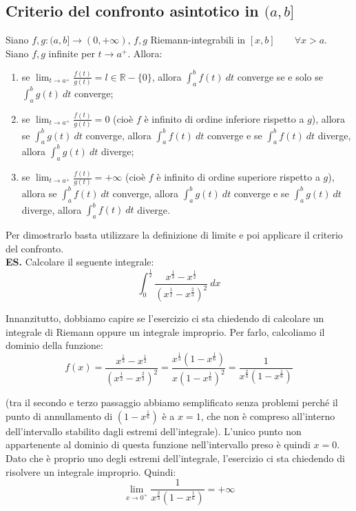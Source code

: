 \documentclass{article}
\begin{document}
\subsection{Criterio del confronto asintotico in $(a, b]$}
Siano $f, g: (a, b] \xrightarrow{} (0, +\infty)$, $f, g$ Riemann-integrabili in $[x, b] \qquad \forall x > a$. Siano $f, g$ infinite per $t \to a^+$. Allora:
\begin{enumerate}
    \item se $\lim_{t \to a^+} \frac{f(t)}{g(t)} = l \in \mathbb{R} - \{0\}$, allora $\int_a^b f(t) \ dt$ converge se e solo se $\int_a^b g(t) \ dt$ converge;
    \item se $\lim_{t \to a^+} \frac{f(t)}{g(t)} = 0$ (cioè $f$ è infinito di ordine inferiore rispetto a $g$), allora se $\int_a^b g(t) \ dt$ converge, allora $\int_a^b f(t) \ dt$ converge e se $\int_a^b f(t) \ dt$ diverge, allora $\int_a^b g(t) \ dt$ diverge;
    \item se $\lim_{t \to a^+} \frac{f(t)}{g(t)} = +\infty$ (cioè $f$ è infinito di ordine superiore rispetto a $g$), allora se $\int_a^b f(t) \ dt$ converge, allora $\int_a^b g(t) \ dt$ converge e se $\int_a^b g(t) \ dt$ diverge, allora $\int_a^b f(t) \ dt$ diverge.
\end{enumerate}

\noindent Per dimostrarlo basta utilizzare la definizione di limite e poi applicare il criterio del confronto.\\

\noindent\textbf{ES.} Calcolare il seguente integrale:
\begin{equation*}
    \int_0^{\frac{1}{2}} \frac{x^{\frac{1}{3}} - x^{\frac{1}{2}}}{(x^{\frac{1}{2}} - x^{\frac{2}{3}})^2} \ dx
\end{equation*}

\noindent Innanzitutto, dobbiamo capire se l'esercizio ci sta chiedendo di calcolare un integrale di Riemann oppure un integrale improprio. Per farlo, calcoliamo il dominio della funzione:
\begin{equation*}
    f(x) = \frac{x^{\frac{1}{3}} - x^{\frac{1}{2}}}{(x^{\frac{1}{2}} - x^{\frac{2}{3}})^2} = \frac{x^{\frac{1}{3}}(1 - x^{\frac{1}{6}})}{x(1 - x^{\frac{1}{6}})^2} = \frac{1}{x^{\frac{2}{3}} (1 - x^{\frac{1}{6}})}
\end{equation*}

\noindent (tra il secondo e terzo passaggio abbiamo semplificato senza problemi perché il punto di annullamento di $(1 - x^\frac{1}{6})$ è a $x = 1$, che non è compreso all'interno dell'intervallo stabilito dagli estremi dell'integrale). L'unico punto non appartenente al dominio di questa funzione nell'intervallo preso è quindi $x = 0$. Dato che è proprio uno degli estremi dell'integrale, l'esercizio ci sta chiedendo di risolvere un integrale improprio. Quindi:
\begin{equation*}
    \lim_{x \to 0^+} \frac{1}{x^{\frac{2}{3}} (1 - x^{\frac{1}{6}})} = +\infty
\end{equation*}
\end{document}
